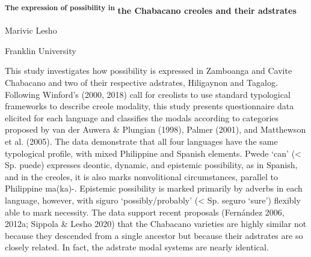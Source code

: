 
\clearpage\setcounter{page}{1}\begin{stylelsAbstract}
\textbf{\textup{\textsuperscript{The expression of possibility in }}}\textbf{\textup{the Chabacano creoles and their adstrates }}
\end{stylelsAbstract}

\begin{stylelsAbstract}
\textup{Marivic Lesho}
\end{stylelsAbstract}

\begin{stylelsAbstract}
\textup{Franklin University}
\end{stylelsAbstract}

\begin{stylelsAbstract}
\textup{This study investigates how possibility is expressed in Zamboanga and Cavite Chabacano and two of their respective adstrates, Hiligaynon and Tagalog. Following }\textup{W}\textup{inford's (2000, 2018)}\textup{ call for creolists to use standard typological frameworks to describe creole modality, this study presents questionnaire data elicited for each language and classifies the modals according to categories proposed by }\textup{v}\textup{an der Auwera \& Plungian (1998}\textup{), }\textup{P}\textup{almer (2001}\textup{), and }\textup{M}\textup{atthewson et al. (2005}\textup{). The data demonstrate that all four languages have the same typological profile, with mixed Philippine and Spanish elements. }Pwede\textup{ ‘can’ ({\textless} Sp. }puede\textup{)} \textup{expresses deontic, dynamic, and epistemic possibility, as in Spanish, and in the creoles, it is also marks nonvolitional circumstances, parallel to Philippine }ma(ka)-\textup{. Epistemic possibility is marked primarily by adverbs in each language, however, with }siguro\textup{ ‘possibly/probably’ ({\textless} Sp. }seguro\textup{ ‘sure’) flexibly able to mark necessity. The data support recent proposals }\textup{(}\textup{Fernández 2006, 2012a;}\textup{ }\textup{S}\textup{ippola \& Lesho 2020)}\textup{ that the Chabacano varieties are highly similar not because they descended from a single ancestor but because their adstrates are so closely related. In fact, the adstrate modal systems are nearly identical.}
\end{stylelsAbstract}


